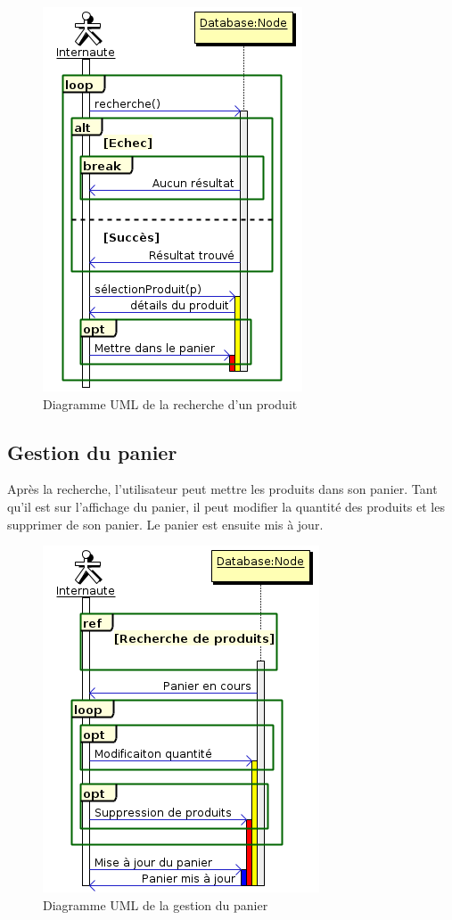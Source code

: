 \documentclass[12pt]{article}
\begin{document}
\begin{figure}[ht]
    \center
    \includegraphics[scale=0.7]{../Diagrams/SequenceDiagrams/recherche.png}
    \caption*{Diagramme UML de la recherche d'un produit}
\end{figure}

\subsection{Gestion du panier}

Après la recherche, l'utilisateur peut mettre les produits dans son panier.
Tant qu'il est sur l'affichage du panier, il peut modifier la quantité des produits et les supprimer de son panier.
Le panier est ensuite mis à jour.

\begin{figure}[ht]
    \center
    \includegraphics[scale=0.7]{../Diagrams/SequenceDiagrams/panier.png}
    \caption*{Diagramme UML de la gestion du panier}
\end{figure}
\end{document}
